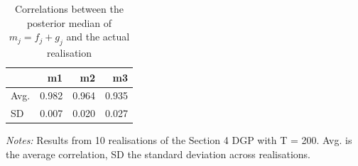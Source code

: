 \begin{table}[htbp]
\centering
\caption{Correlations between the posterior median of $m_j = f_j + g_j$ and the actual realisation}
\label{tab:sim}
\begin{tabular}{lrrr}
\toprule
 & m1 & m2 & m3 \\
\midrule
Avg. & 0.982 & 0.964 & 0.935 \\
SD & 0.007 & 0.020 & 0.027 \\
\bottomrule
\end{tabular}
\begin{minipage}{0.95\linewidth}\footnotesize\emph{Notes:} Results from 10 realisations of the Section 4 DGP with T = 200. Avg. is the average correlation, SD the standard deviation across realisations.\end{minipage}
\end{table}